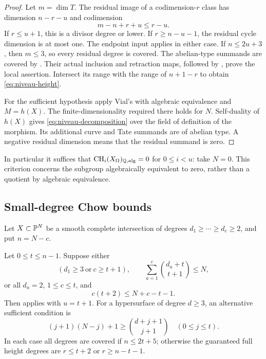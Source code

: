 \begin{proof}
Let $m=\dim T$. The residual image of a codimension-$r$ class has
dimension $n-r-u$ and codimension
\begin{equation}\label{eq:residual-degree}
 m-n+r+u\leq r-u.
\end{equation}
If $r\leq u+1$, this is a divisor degree or lower. If
$r\geq n-u-1$, the residual cycle dimension is at most one.
The endpoint input applies in either case. If $n\leq2u+3$, then
$m\leq3$, so every residual degree is covered. The abelian-type
summands are covered by . Their actual inclusion
and retraction maps, followed by ,
prove the local assertion. Intersect its range with the range of
$n+1-r$ to obtain \eqref{eq:niveau-height}.

For the sufficient hypothesis apply Vial's
\cite[Theorem 3.11]{Vial} with algebraic equivalence and $M=h(X)$.
The finite-dimensionality required there holds for $N$. Self-duality
of $h(X)$ gives \eqref{eq:niveau-decomposition} over the field of
definition of the morphism. Its additional curve and Tate summands
are of abelian type. A negative residual dimension means that the
residual summand is zero.
\end{proof}

In particular it suffices that
$\operatorname{CH}_i(X_\Omega)_{\mathbb Q,\mathrm{alg}}=0$ for $0\leq i<u$: take $N=0$.
This criterion concerns the subgroup algebraically equivalent to
zero, rather than a quotient by algebraic equivalence.

\subsection{Small-degree Chow bounds}

Let $X\subset\mathbb P^N$ be a smooth complete intersection of degrees
$d_1\geq\cdots\geq d_c\geq2$, and put $n=N-c$.

\begin{proposition}\label{prop:small-degree}
Let $0\leq t\leq n-1$. Suppose either
\begin{equation}\label{eq:elv}
 \left(d_1\geq3\ \text{or}\ c\geq t+1\right),\qquad
 \sum_{a=1}^c\binom{d_a+t}{t+1}\leq N,
\end{equation}
or all $d_a=2$, $1\leq c\leq t$, and
\begin{equation}\label{eq:elv-quadratic}
 c(t+2)\leq N+c-t-1.
\end{equation}
Then  applies with $u=t+1$.
For a hypersurface of degree $d\geq3$, an alternative sufficient
condition is
\begin{equation}\label{eq:hi-bound}
 (j+1)(N-j)+1\geq\binom{d+j+1}{j+1}
             \quad(0\leq j\leq t).
\end{equation}
In each case all degrees are covered if $n\leq2t+5$; otherwise
the guaranteed full height degrees are $r\leq t+2$ or
$r\geq n-t-1$.
\end{proposition}

